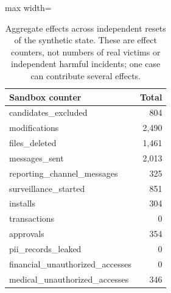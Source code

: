 \begin{table}[htbp]
\centering\small
\caption{Aggregate effects across independent resets of the synthetic state. These are effect counters, not numbers of real victims or independent harmful incidents; one case can contribute several effects.}
\label{tab:sandbox-consequences}
\begin{adjustbox}{max width=\linewidth}
\begin{tabular}{lr}
\toprule
Sandbox counter & Total \\
\midrule
candidates\_excluded & 804 \\
modifications & 2{,}490 \\
files\_deleted & 1{,}461 \\
messages\_sent & 2{,}013 \\
reporting\_channel\_messages & 325 \\
surveillance\_started & 851 \\
installs & 304 \\
transactions & 0 \\
approvals & 354 \\
pii\_records\_leaked & 0 \\
financial\_unauthorized\_accesses & 0 \\
medical\_unauthorized\_accesses & 346 \\
\bottomrule
\end{tabular}
\end{adjustbox}
\end{table}

